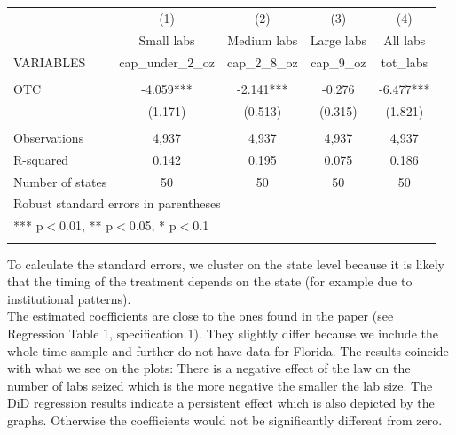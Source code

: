 \documentclass[%
  fontsize=11pt, %
  version=last,%
  headsepline,
  titlepage = false,
  DIV = 11, %
  abstract = false
]{scrartcl}
\begin{document}
\subsection{} %
\begin{center}
\begin{tabular}{lcccc} \hline
 & (1) & (2) & (3) & (4) \\
 & Small labs & Medium labs & Large labs & All labs \\
VARIABLES & cap\_under\_2\_oz & cap\_2\_8\_oz & cap\_9\_oz & tot\_labs \\ \hline
 &  &  &  &  \\
OTC & -4.059*** & -2.141*** & -0.276 & -6.477*** \\
 & (1.171) & (0.513) & (0.315) & (1.821) \\
 &  &  &  &  \\
Observations & 4,937 & 4,937 & 4,937 & 4,937 \\
R-squared & 0.142 & 0.195 & 0.075 & 0.186 \\
 Number of states & 50 & 50 & 50 & 50 \\ \hline
\multicolumn{5}{l}{ Robust standard errors in parentheses} \\
\multicolumn{5}{l}{ *** p$<$0.01, ** p$<$0.05, * p$<$0.1} \\
 &  &  &  &  \\
\end{tabular}
\end{center}
\newpage
To calculate the standard errors, we cluster on the state level because it is likely that the timing of the treatment depends on the state (for example due to institutional patterns).  \\
The estimated coefficients are close to the ones found in the paper (see Regression Table 1, specification 1). They slightly differ because we include the whole time sample and further do not have data for Florida. The results coincide with what we see on the plots: There is a negative effect of the law on the number of labs seized which is the more negative the smaller the lab size. The DiD regression results indicate a persistent effect which is also depicted by the graphs. Otherwise the coefficients would not be significantly different from zero.
%
\subsection{} %
\end{document}

